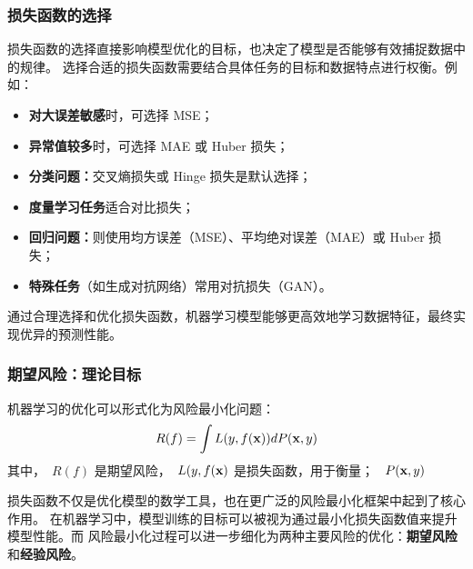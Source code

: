 \subsubsection{损失函数的选择}
损失函数的选择直接影响模型优化的目标，也决定了模型是否能够有效捕捉数据中的规律。
选择合适的损失函数需要结合具体任务的目标和数据特点进行权衡。例如：
\begin{itemize}
\item {\bf 对大误差敏感}时，可选择 MSE；
\item {\bf 异常值较多}时，可选择 MAE 或 Huber 损失；
\item {\bf 分类问题：}交叉熵损失或 Hinge 损失是默认选择；
\item {\bf 度量学习任务}适合对比损失；
\item {\bf 回归问题：}则使用均方误差（MSE）、平均绝对误差（MAE）或 Huber 损失；
\item {\bf 特殊任务}（如生成对抗网络）常用对抗损失（GAN）。
\end{itemize}
通过合理选择和优化损失函数，机器学习模型能够更高效地学习数据特征，最终实现优异的预测性能。

%


\subsubsection{ 期望风险：理论目标}
机器学习的优化可以形式化为风险最小化问题：
$$
R(f) = \int L(y,f({\bf x})) dP({\bf x},y)
$$
其中，~$R(f)$ 是期望风险，~$L(y,f({\bf x})$ 是损失函数，用于衡量； ~$P({\bf x},y)$ 

损失函数不仅是优化模型的数学工具，也在更广泛的风险最小化框架中起到了核心作用。
在机器学习中，模型训练的目标可以被视为通过最小化损失函数值来提升模型性能。而
风险最小化过程可以进一步细化为两种主要风险的优化：{\bf 期望风险}和{\bf 经验风险}。


